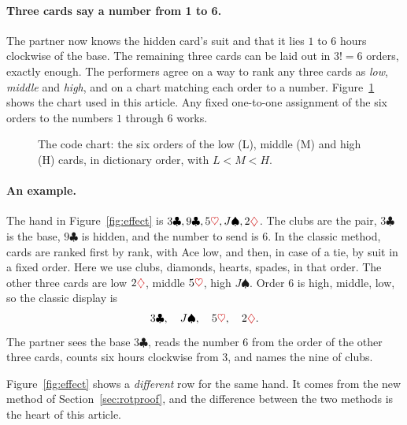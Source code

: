 \documentclass[11pt]{article}
\newcommand{\cl}{\ensuremath{\clubsuit}}
\newcommand{\di}{\textcolor{red!80!black}{\ensuremath{\diamondsuit}}}
\newcommand{\he}{\textcolor{red!80!black}{\ensuremath{\heartsuit}}}
\newcommand{\spd}{\ensuremath{\spadesuit}}
\begin{document}
\paragraph{Three cards say a number from 1 to 6.} The partner now knows the hidden card's suit and that it lies $1$ to $6$ hours clockwise of the base. The remaining three cards can be laid out in $3!=6$ orders, exactly enough. The performers agree on a way to rank any three cards as \emph{low}, \emph{middle} and \emph{high}, and on a chart matching each order to a number. Figure~\ref{fig:code} shows the chart used in this article. Any fixed one-to-one assignment of the six orders to the numbers $1$ through $6$ works.

\begin{figure}[ht]
\centering
{}
\caption{The code chart: the six orders of the low (L), middle (M) and high (H) cards,
in dictionary order, with $L<M<H$.}
\label{fig:code}
\end{figure}

\paragraph{An example.} The hand in Figure~\ref{fig:effect} is
$3\cl, 9\cl, 5\he, J\spd, 2\di$. The clubs are the pair, $3\cl$ is the base, $9\cl$ is hidden, and the number to send is $6$. In the classic method, cards are ranked first by rank, with Ace low, and then, in case of a tie, by suit in a fixed order. Here we use clubs, diamonds, hearts, spades, in that order. The other three cards are low $2\di$, middle $5\he$, high $J\spd$. Order $6$ is high, middle, low, so the classic display is
\[
  3\cl,\quad J\spd,\quad 5\he,\quad 2\di .
\]
The partner sees the base $3\cl$, reads the number $6$ from the order of the other three cards, counts six hours clockwise from $3$, and names the nine of clubs.

Figure~\ref{fig:effect} shows a \emph{different} row for the same hand. It comes from the new method of Section~\ref{sec:rotproof}, and the difference between the two methods is the heart of this article.
\end{document}
